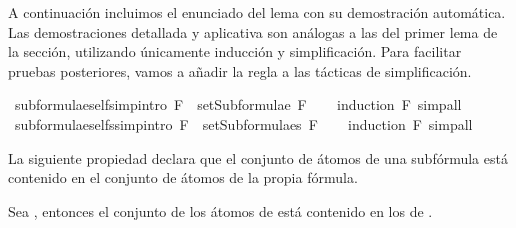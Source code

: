 \begin{isabellebody}
\begin{isamarkuptext}
A continuación incluimos el enunciado del lema con su demostración automática. Las demostraciones detallada
y aplicativa son análogas a las del primer lema de la sección, utilizando únicamente inducción y 
simplificación. Para facilitar pruebas posteriores, vamos a añadir la regla a las tácticas de 
simplificación.%
\end{isamarkuptext}\isamarkuptrue%
\isamarkupfalse%
\ subformulae{\isacharunderscore}self{\isacharbrackleft}simp{\isacharcomma}intro{\isacharbrackright}{\isacharcolon}\ {\isachardoublequoteopen}F\ {\isasymin}\ setSubformulae\ F{\isachardoublequoteclose}\isanewline
%
\isadelimproof
\ \ %
\endisadelimproof
%
\isatagproof
{}\isamarkupfalse%
\ {\isacharparenleft}induction\ F{\isacharparenright}\ simp{\isacharunderscore}all%
\endisatagproof
{\isafoldproof}%
%
\isadelimproof
\ \isanewline
%
\endisadelimproof
\isanewline
{}\isamarkupfalse%
\ subformulae{\isacharunderscore}self{\isacharunderscore}s{\isacharbrackleft}simp{\isacharcomma}intro{\isacharbrackright}{\isacharcolon}\ {\isachardoublequoteopen}F\ {\isasymin}\ setSubformulae{\isacharunderscore}s\ F{\isachardoublequoteclose}\isanewline
%
\isadelimproof
\ \ %
\endisadelimproof
%
\isatagproof
{}\isamarkupfalse%
\ {\isacharparenleft}induction\ F{\isacharparenright}\ simp{\isacharunderscore}all%
\endisatagproof
{\isafoldproof}%
%
\isadelimproof
%
\endisadelimproof
%
\begin{isamarkuptext}%
La siguiente propiedad declara que el conjunto de átomos de una subfórmula está contenido en el
conjunto de átomos de la propia fórmula.
\begin{lema}
    Sea , entonces el conjunto de los átomos de  está contenido en los de .
  \end{lema}


\end{isamarkuptext}
\end{isabellebody}
